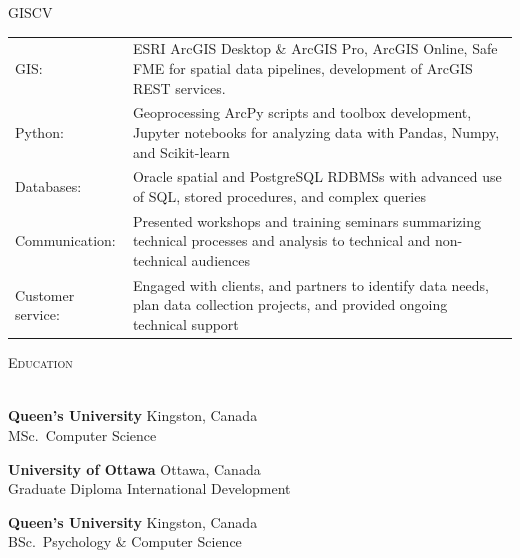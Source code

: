 \documentclass[letterpaper]{article}
\newcommand{\lineunder} {
        \vspace*{-8pt} \\
        \hspace*{-18pt} \hrulefill \\
    }
\newcommand{\header} [1] {
        {\hspace*{-18pt}\vspace*{6pt} \textsc{#1}}
        \vspace*{-6pt} \lineunder
        \vspace{1mm}
    }
\newcommand{\university}[3]{
        \textbf{#1}  %
        \hfill #2\\  %
        #3\\         %
        \vspace{2mm}
    }
\begin{document}
    \begin{taggedblock}{GISCV}
        \begin{tabular}[t]{ l L{5.17in} }
            GIS:& 
                ESRI ArcGIS Desktop \& ArcGIS Pro, ArcGIS Online, Safe FME for
                spatial data pipelines, development of ArcGIS REST services. \\
            Python:& 
                Geoprocessing ArcPy scripts and toolbox development, Jupyter notebooks 
                for analyzing data with Pandas, Numpy, and Scikit-learn \\
            Databases:& 
                Oracle spatial and PostgreSQL RDBMSs with advanced use of SQL,
                stored procedures, and complex queries \\
            Communication: &
                Presented workshops and training seminars summarizing technical
                processes and analysis to technical and non-technical audiences \\
            Customer service: &
                Engaged with clients, and partners to identify data needs, plan data
                collection projects, and provided ongoing technical support \\
        \end{tabular}
    \end{taggedblock}

\vspace{1mm}



\header{Education}
    \university
        {Queen's University}
        {Kingston, Canada}
        {MSc.~Computer Science}

    \university
        {University of Ottawa}
        {Ottawa, Canada}
        {Graduate Diploma International Development}

    \university
        {Queen's University}
        {Kingston, Canada}
        {BSc.~Psychology \& Computer Science}
\end{document}
